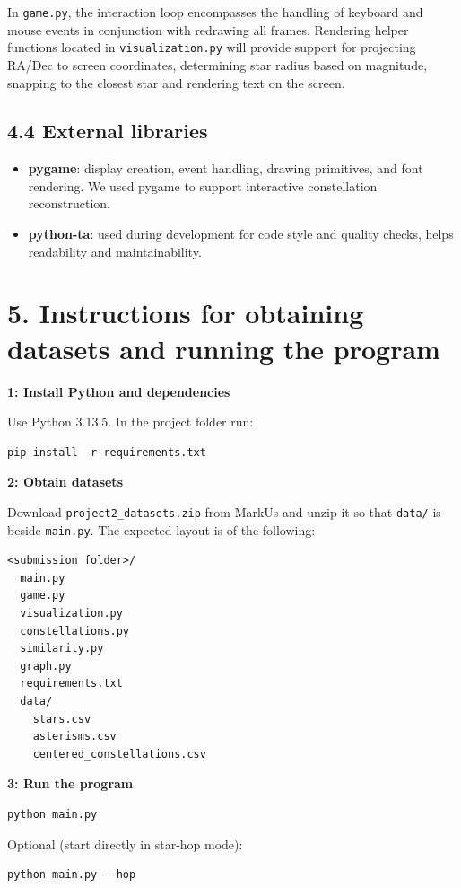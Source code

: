 \documentclass[11pt]{article}
\begin{document}
In \texttt{game.py}, the interaction loop encompasses the handling of keyboard and mouse events in conjunction with redrawing all frames. Rendering helper functions located in \texttt{visualization.py} will provide support for projecting RA/Dec to screen coordinates, determining star radius based on magnitude, snapping to the closest star and rendering text on the screen.

\subsection*{4.4 External libraries}

\begin{itemize}
    \item \textbf{pygame}: display creation, event handling, drawing primitives, and font rendering. We used pygame to support interactive constellation reconstruction.
    \item \textbf{python-ta}: used during development for code style and quality checks, helps readability and maintainability.
\end{itemize}

\section*{5. Instructions for obtaining datasets and running the program}

\textbf{1: Install Python and dependencies}

Use Python 3.13.5. In the project folder run:
\begin{verbatim}
pip install -r requirements.txt
\end{verbatim}

\textbf{2: Obtain datasets}

Download \texttt{project2\_datasets.zip} from MarkUs and unzip it so that \texttt{data/} is beside \texttt{main.py}. The expected layout is of the following:
\begin{verbatim}
<submission folder>/
  main.py
  game.py
  visualization.py
  constellations.py
  similarity.py
  graph.py
  requirements.txt
  data/
    stars.csv
    asterisms.csv
    centered_constellations.csv
\end{verbatim}

\textbf{3: Run the program}
\begin{verbatim}
python main.py
\end{verbatim}
Optional (start directly in star-hop mode):
\begin{verbatim}
python main.py --hop
\end{verbatim}
\end{document}
